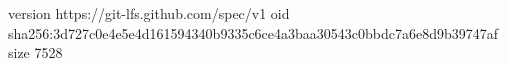 version https://git-lfs.github.com/spec/v1
oid sha256:3d727c0e4e5e4d161594340b9335c6ce4a3baa30543c0bbdc7a6e8d9b39747af
size 7528
